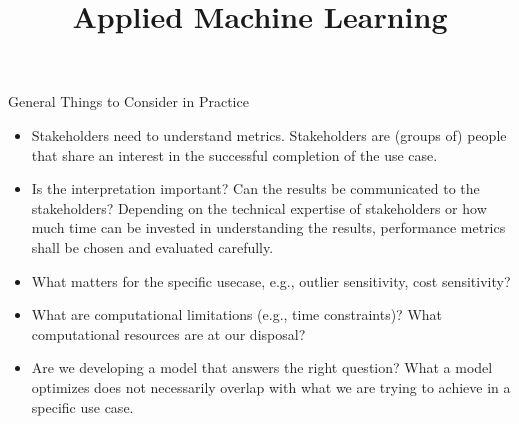 \documentclass[11pt,compress,t,notes=noshow, aspectratio=169, xcolor=table]{beamer}
\title{Applied Machine Learning}
\date{}
\begin{document}
\newcommand{\titlefigure}{figure/performance_vs_interpretability}
\newcommand{\learninggoals}{
\item What to watch out for in practice
\item Pros and cons of performance metrics
\item Advanced evaluation practices}



\begin{frame}{General Things to Consider in Practice}

\begin{itemize}
\setlength\itemsep{2em}
    \item Stakeholders need to understand metrics. Stakeholders are (groups of) people that share an interest in the successful completion of the use case. 
    \item Is the interpretation important? Can the results be communicated to the stakeholders? Depending on the technical expertise of stakeholders or how much time can be invested in understanding the results, performance metrics shall be chosen and evaluated carefully.
    \item What matters for the specific usecase, e.g., outlier sensitivity, cost sensitivity?
    \item What are computational limitations (e.g., time constraints)? What computational resources are at our disposal?
    \item Are we developing a model that answers the right question? What a model optimizes does not necessarily overlap with what we are trying to achieve in a specific use case.
\end{itemize}
\end{frame}
\end{document}
